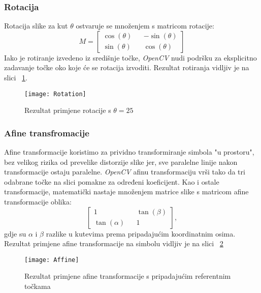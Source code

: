 \subsubsection{Rotacija}
Rotacija slike za kut $\theta$ ostvaruje se množenjem s matricom rotacije:
$$
M
=
\begin{bmatrix}
	\cos(\theta) && -\sin(\theta) \\
	\sin(\theta) && \cos(\theta)
\end{bmatrix}
$$
Iako je rotiranje izvedeno iz središnje točke, \emph{OpenCV} nudi podršku za eksplicitno zadavanje točke oko koje će se rotacija izvoditi.
Rezultat rotiranja vidljiv je na slici ~\ref{fig:Rotating}.
\lstset{numbers=left}

\begin{figure}[h!]
	\centering
	\texttt{[image: Rotation]}
	 \caption{Rezultat primjene rotacije s $\theta = 25$}
 	 \label{fig:Rotating}
\end{figure}
\subsubsection{Afine transfromacije}
Afine transformacije koristimo za prividno transformiranje simbola "u prostoru", bez velikog rizika od prevelike distorzije slike jer, sve paralelne linije nakon transformacije ostaju paralelne.
\emph{OpenCV} afinu transformaciju vrši tako da tri odabrane točke na slici pomakne za određeni koeficijent.
Kao i ostale transformacije, matematički nastaje množenjem matrice slike s matricom afine transformacije oblika:
$$
\begin{bmatrix}
	1 && \tan(\beta) \\
	\tan(\alpha) && 1
\end{bmatrix} ,
$$
gdje su $\alpha$ i $\beta$ razlike u kutevima prema pripadajućim koordinatnim osima.
Rezultat primjene afine transformacije na simbolu vidljiv je na slici ~\ref{fig:Affine}
\lstset{numbers=left}

\begin{figure}[h!]
	\centering
	\texttt{[image: Affine]}
	 \caption{Rezultat primjene afine transformacije s pripadajućim referentnim točkama}
 	 \label{fig:Affine}
\end{figure}

